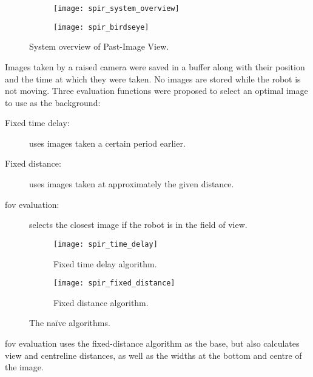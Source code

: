   \begin{figure}[h]
    \centering
    \begin{subfigure}[b]{0.45\textwidth}
      \texttt{[image: spir\_system\_overview]}
    \end{subfigure}
    \hfill
    \begin{subfigure}[b]{0.45\textwidth}
      \texttt{[image: spir\_birdseye]}
    \end{subfigure}
    \caption[\acrshort{spir} system overview]{System overview of Past-Image View.\cite{shiroma2004}}
    \label{fig:spir_system_overview}
  \end{figure}

  Images taken by a raised camera were saved in a buffer along with their position and the time at which they were taken.
  No images are stored while the robot is not moving.
  Three evaluation functions were proposed to select an optimal image to use as the background:

  \begin{description}
    \item [Fixed time delay:] uses images taken a certain period earlier.
    \item [Fixed distance:] uses images taken at approximately the given distance.
    \item [\Gls{fov} evaluation:] selects the closest image if the robot is in the field of view.
  \end{description}

  \begin{figure}[h]
    \centering
    \begin{subfigure}[b]{0.45\textwidth}
      \texttt{[image: spir\_time\_delay]}
      \caption{Fixed time delay algorithm.}
      \label{fig:spir_time_delay}
    \end{subfigure}
    \hfill
    \begin{subfigure}[b]{0.45\textwidth}
      \texttt{[image: spir\_fixed\_distance]}
      \caption{Fixed distance algorithm.}
      \label{fig:spir_fixed_distance}
    \end{subfigure}
    \caption[\acrshort{spir} naïve algorithms]{The naïve algorithms.\cite{shiroma2004}}
    \label{fig:spir_naive_algorithms}
  \end{figure}

  \Gls{fov} evaluation uses the fixed-distance algorithm as the base, but also calculates view and centreline distances, as well as the widths at the bottom and centre of the image.

